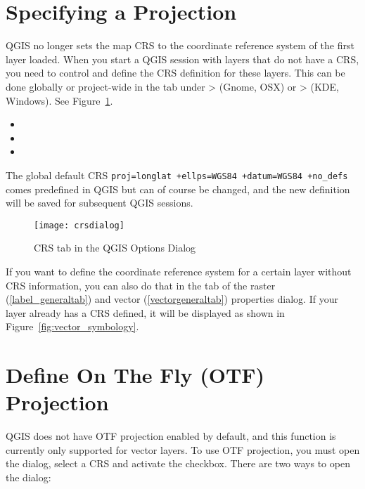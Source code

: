 \section{Specifying a Projection}
\label{sec:projection-specifying}

QGIS no longer sets the map CRS to the coordinate reference system of the
first layer loaded. When you start a QGIS session with layers that do not
have a CRS, you need to control and define the CRS definition for these
layers. This can be done globally or project-wide in the  tab under
 >  (Gnome, OSX) 
or  >  (KDE, Windows). 
See Figure~\ref{fig:crsdialog}. 

\begin{itemize}[label=--]
\item {} 
\item {}
\item {}
\end{itemize}

The global default CRS \texttt{proj=longlat +ellps=WGS84 +datum=WGS84
+no\_defs} comes predefined in QGIS but can of course be changed, and the new
definition will be saved for subsequent QGIS sessions.    

\begin{figure}[ht]
   \centering
   \caption{CRS tab in the QGIS Options Dialog \nixcaption}\label{fig:crsdialog}\smallskip
   \texttt{[image: crsdialog]}\end{figure}

If you want to define the coordinate reference system for a certain layer
without CRS information, you can also do that in the  tab of the
raster (\ref{label_generaltab}) and vector (\ref{vectorgeneraltab}) properties 
dialog. If your layer already has a CRS defined, it
will be displayed as shown in Figure~\ref{fig:vector_symbology}.

\section{Define On The Fly (OTF) Projection}\label{label_projstart}

QGIS does not have OTF projection enabled by default, and this function is
currently only supported for vector layers. To use OTF projection, you must
open the  dialog, select a
CRS and activate the  checkbox.
There are two ways to open the dialog:


